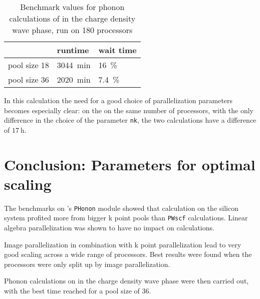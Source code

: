 \documentclass[main.tex]{subfiles}
\begin{document}
\begin{table}[ht!]
    \caption{Benchmark values for phonon calculations of \TaS in the charge density wave phase, run on 180 processors}
    \begin{tabular}{@{}lll@{}}
    \toprule
                 & runtime            & wait time \\ \midrule
    pool size 18 & \SI{3044}{\minute} & \SI{16}{\percent}         \\
    pool size 36 & \SI{2020}{\minute} & \SI{7.4}{\percent}
    \end{tabular}
    \label{tab:tas2_cdw_phonon_times}
\end{table}
In this calculation the need for a good choice of parallelization parameters becomes especially clear:
on the on the same number of processors, with the only difference in the choice of the parameter \texttt{nk}, the two calculations have a difference of \(\SI{17}{\hour}\).

\section{Conclusion: Parameters for optimal scaling}

The benchmarks on \QE's \texttt{PHonon} module showed that calculation on the silicon system profited more from bigger k point pools than \texttt{PWscf} calculations.
Linear algebra parallelization was shown to have no impact on calculations.

Image parallelization in combination with k point parallelization lead to very good scaling across a wide range of processors.
Best results were found when the processors were only split up by image parallelization.

Phonon calculations on \TaS in the charge density wave phase were then carried out, with the best time reached for a pool size of 36.
\end{document}
